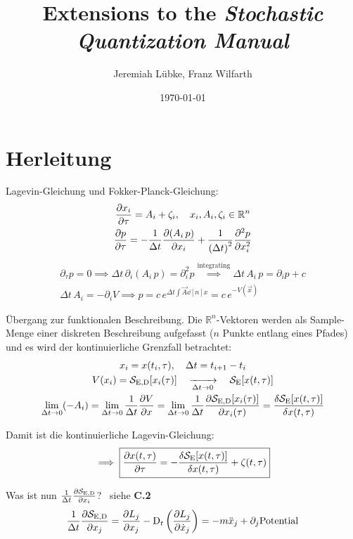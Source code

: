 \documentclass[11pt,a4paper]{scrartcl}
\title{Extensions to the \emph{Stochastic Quantization Manual}}
\author{Jeremiah Lübke, Franz Wilfarth}
\date{\today}
\newcommand{\OverDeltaT}[1]{\ensuremath{\frac{#1}{\Delta t}}}
\newcommand{\DT}{\ensuremath{\mathrm{D}_t}}
\newcommand{\SE}{\ensuremath{\mathcal{S}_{\mathrm{E}}}}
\newcommand{\SED}{\ensuremath{\mathcal{S}_{\mathrm{E,D}}}}
\begin{document}
\maketitle

\section*{Herleitung}
Lagevin-Gleichung und Fokker-Planck-Gleichung:
\begin{gather}
    \pdv{x_i}{\tau}=A_i+\zeta_i \qc x_i, A_i, \zeta_i \in \mathbb{R}^n \\
    \pdv{p}{\tau}=-\OverDeltaT{1}\pdv{(A_i\,p)}{x_i}+\frac{1}{\left(\Delta{t}\right)^2}\pdv[2]{p}{x_i}
    \label{eq:fp}
\end{gather}
\begin{gather*}
    \partial_{\tau}p=0 \implies \Delta{t}\,\partial_i(A_i\,p)=\partial_i^2{p}
    \overset{\mathrm{integrating}}{\implies} \Delta{t}\,A_i\,p=\partial_i{p}+c \\
    \Delta{t}\,A_i=-\partial_i{V} \implies
    p=c\,e^{\Delta{t}\int\vec{A}\dd[n]{x}}=c\,e^{-V(\vec{x})}
\end{gather*}

Übergang zur funktionalen Beschreibung.
Die $\mathbb{R}^n$-Vektoren werden als Sample-Menge einer diskreten Beschreibung
aufgefasst ($n$ Punkte entlang eines Pfades) und es wird der kontinuierliche
Grenzfall betrachtet:
\begin{gather}
    x_i=x(t_i,\tau) \qc \Delta{t}=t_{i+1}-t_i \nonumber \\
    V(x_i)=\SED[x_i(\tau)]
    \quad\xrightarrow[\Delta{t}\to{0}]{}\quad
    \SE[x(t, \tau)] \nonumber \\
    \lim_{\Delta{t}\to{0}}(-A_i)
    =\lim_{\Delta{t}\to{0}}\OverDeltaT{1}\pdv{V}{x}
    =\lim_{\Delta{t}\to{0}}\frac{1}{\Delta{t}}\pdv{\SED[x_i(\tau)]}{x_i(\tau)}
    =\fdv{\SE[x(t,\tau)]}{x(t,\tau)}
\end{gather}

Damit ist die kontinuierliche Lagevin-Gleichung:
\begin{equation}
    \implies\boxed{\pdv{x(t,\tau)}{\tau}=-\fdv{\SE[x(t,\tau)]}{x(t,\tau)}+\zeta(t,\tau)}
\end{equation}


Was ist nun $\frac{1}{\Delta{t}}\pdv{\SED}{x_i}$? \textrightarrow~siehe \textbf{C.2}
\begin{equation}
    \frac{1}{\Delta{t}}\pdv{\SED}{x_j}=\pdv{L_j}{x_j}-\DT\left(\pdv{L_j}{\dot{x}_j}\right)
    =-m\ddot{x}_j+\partial_j{\mathrm{Potential}}
\end{equation}
\end{document}
